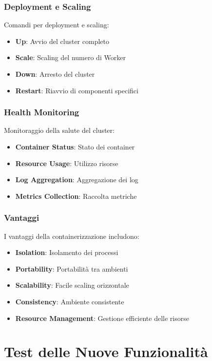 \documentclass[12pt,a4paper]{article}
\begin{document}
\subsubsection{Deployment e Scaling}

Comandi per deployment e scaling:

\begin{itemize}
\item \textbf{Up}: Avvio del cluster completo
\item \textbf{Scale}: Scaling del numero di Worker
\item \textbf{Down}: Arresto del cluster
\item \textbf{Restart}: Riavvio di componenti specifici
\end{itemize}

\subsubsection{Health Monitoring}

Monitoraggio della salute del cluster:

\begin{itemize}
\item \textbf{Container Status}: Stato dei container
\item \textbf{Resource Usage}: Utilizzo risorse
\item \textbf{Log Aggregation}: Aggregazione dei log
\item \textbf{Metrics Collection}: Raccolta metriche
\end{itemize}

\subsubsection{Vantaggi}

I vantaggi della containerizzazione includono:

\begin{itemize}
\item \textbf{Isolation}: Isolamento dei processi
\item \textbf{Portability}: Portabilità tra ambienti
\item \textbf{Scalability}: Facile scaling orizzontale
\item \textbf{Consistency}: Ambiente consistente
\item \textbf{Resource Management}: Gestione efficiente delle risorse
\end{itemize}

\section{Test delle Nuove Funzionalità}
\end{document}
